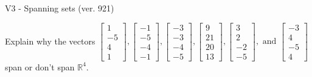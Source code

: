 \begin{exercise}
  \begin{exerciseTitle}V3 - Spanning sets (ver. 921)\end{exerciseTitle}
  \begin{exerciseStatement}
    Explain why the vectors \(\left[\begin{array}{r}
1 \\
-5 \\
4 \\
1
\end{array}\right] , \left[\begin{array}{r}
-1 \\
-5 \\
-4 \\
-1
\end{array}\right] , \left[\begin{array}{r}
-3 \\
-3 \\
-4 \\
-5
\end{array}\right] , \left[\begin{array}{r}
9 \\
21 \\
20 \\
13
\end{array}\right] , \left[\begin{array}{r}
3 \\
2 \\
-2 \\
-5
\end{array}\right] , \text{ and } \left[\begin{array}{r}
-3 \\
4 \\
-5 \\
4
\end{array}\right]\) span or don't span \(\mathbb{R}^4\). 
	



\end{exerciseStatement}
\end{exercise}

